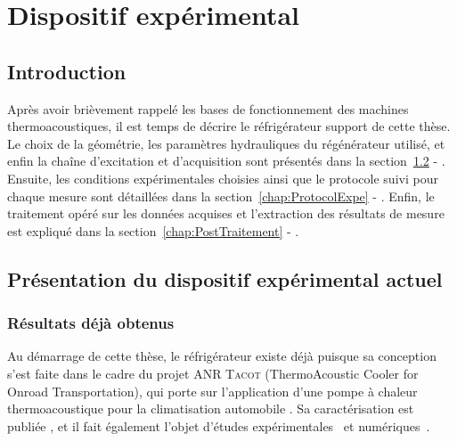 \chapter{Dispositif expérimental}\label{chap:DispositifExpe}
\mylocaltoc
\newpage

\section{Introduction}\label{chap:IntroProtocExp}
Après avoir brièvement rappelé les bases de fonctionnement des machines thermoacoustiques, il est temps de décrire le réfrigérateur support de cette thèse. Le choix de la géométrie, les paramètres hydrauliques du régénérateur utilisé, et enfin la chaîne d'excitation et d'acquisition sont présentés dans la section~\ref{chap:PresentationTacot} - . Ensuite, les conditions expérimentales choisies ainsi que le protocole suivi pour chaque mesure sont détaillées dans la section~\ref{chap:ProtocolExpe} - . Enfin, le traitement opéré sur les données acquises et l'extraction des résultats de mesure est expliqué dans la section~\ref{chap:PostTraitement} - .


\section{Présentation du dispositif expérimental actuel}\label{chap:PresentationTacot}

\subsection{Résultats déjà obtenus}\label{chap:PresTacot_ResultatsATE}

Au démarrage de cette thèse, le réfrigérateur existe déjà puisque sa conception s'est faite dans le cadre du projet ANR \textsc{Tacot} (ThermoAcoustic Cooler for Onroad Transportation), qui porte sur l'application d'une pompe à chaleur thermoacoustique pour la climatisation automobile \cite{ANR_thermo-acoustic_2019}. Sa caractérisation est publiée \cite{ramadan_design_2021}, et il fait également l'objet d'études expérimentales~\cite{ramadan_experimental_2018, ramadan_experimental_2021, poignand_test-bench_2022}  et  numériques~\cite{hireche_numerical_2019, hireche_experimental_2020, baltean_gravity_2025}. 

